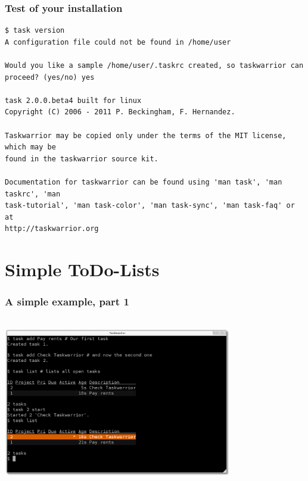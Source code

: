 \documentclass[t,handout]{beamer}
\begin{document}
\begin{frame}[fragile]
\frametitle{Test of your installation}
\begin{lstlisting}
$ task version
A configuration file could not be found in /home/user

Would you like a sample /home/user/.taskrc created, so taskwarrior can proceed? (yes/no) yes

task 2.0.0.beta4 built for linux
Copyright (C) 2006 - 2011 P. Beckingham, F. Hernandez.

Taskwarrior may be copied only under the terms of the MIT license, which may be
found in the taskwarrior source kit.

Documentation for taskwarrior can be found using 'man task', 'man taskrc', 'man
task-tutorial', 'man task-color', 'man task-sync', 'man task-faq' or at
http://taskwarrior.org

\end{lstlisting}
\end{frame}

\section{Simple ToDo-Lists}

\begin{frame}
\frametitle{A simple example, part 1}
\begin{center}
\includegraphics[width=10cm,height=7.5cm]{simple_example01.png}
\end{center}
\end{frame}
\end{document}
